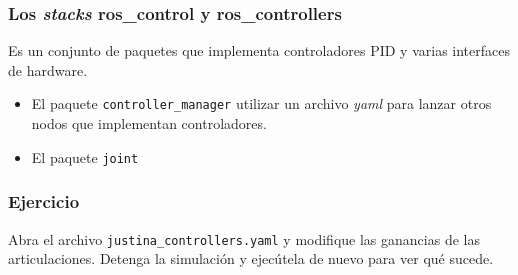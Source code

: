 \begin{frame}\frametitle{Los \textit{stacks} ros\_control y ros\_controllers}
  Es un conjunto de paquetes que implementa controladores PID y varias interfaces de hardware.
  \begin{itemize}
  \item El paquete \texttt{controller\_manager} utilizar un archivo \textit{yaml} para lanzar otros nodos que implementan controladores. 
  \item El paquete \texttt{joint}
  \end{itemize}
\end{frame}

\begin{frame}\frametitle{Ejercicio}
  Abra el archivo \texttt{justina\_controllers.yaml} y modifique las ganancias de las articulaciones. Detenga la simulación y ejecútela de nuevo para ver qué sucede. 
\end{frame}
